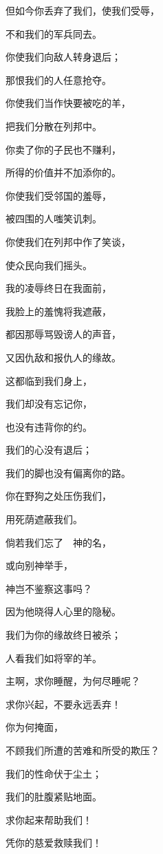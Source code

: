 {\BB \par }{\Q {}但如今你丢弃了我们，使我们受辱，
\par }{\Q 不和我们的军兵同去。
\par }{\Q {}你使我们向敌人转身退后；
\par }{\Q 那恨我们的人任意抢夺。
\par }{\Q {}你使我们当作快要被吃的羊，
\par }{\Q 把我们分散在列邦中。
\par }{\Q {}你卖了你的子民也不赚利，
\par }{\Q 所得的价值并不加添你的{}。
\par }{\BB \par }{\Q {}你使我们受邻国的羞辱，
\par }{\Q 被四围的人嗤笑讥刺。
\par }{\Q {}你使我们在列邦中作了笑谈，
\par }{\Q 使众民向我们摇头。
\par }{\Q {}我的凌辱终日在我面前，
\par }{\Q 我脸上的羞愧将我遮蔽，
\par }{\Q {}都因那辱骂毁谤人的声音，
\par }{\Q 又因仇敌和报仇人的缘故。
\par }{\BB \par }{\Q {}这都临到我们身上，
\par }{\Q 我们却没有忘记你，
\par }{\Q 也没有违背你的约。
\par }{\Q {}我们的心没有退后；
\par }{\Q 我们的脚也没有偏离你的路。
\par }{\Q {}你在野狗之处压伤我们，
\par }{\Q 用死荫遮蔽我们。
\par }{\BB \par }{\Q {}倘若我们忘了　神的名，
\par }{\Q 或向别神举手，
\par }{\Q {}神岂不鉴察这事吗？
\par }{\Q 因为他晓得人心里的隐秘。
\par }{\Q {}我们为你的缘故终日被杀；
\par }{\Q 人看我们如将宰的羊。
\par }{\BB \par }{\Q {}主啊，求你睡醒，为何尽睡呢？
\par }{\Q 求你兴起，不要永远丢弃{}！
\par }{\Q {}你为何掩面，
\par }{\Q 不顾我们所遭的苦难和所受的欺压？
\par }{\Q {}我们的性命伏于尘土；
\par }{\Q 我们的肚腹紧贴地面。
\par }{\Q {}求你起来帮助我们！
\par }{\Q 凭你的慈爱救赎我们！

}
